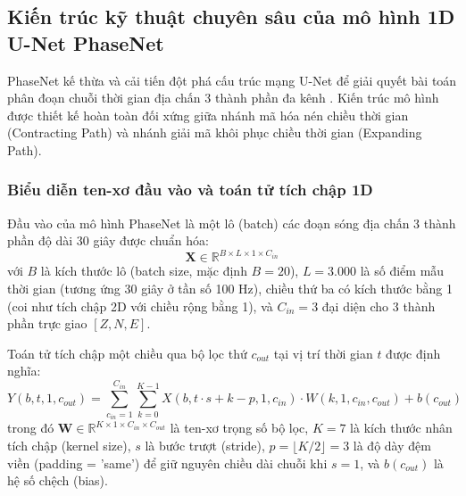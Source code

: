 \documentclass[preprint,1p]{elsarticle}
\begin{document}
\subsection{Kiến trúc kỹ thuật chuyên sâu của mô hình 1D U-Net PhaseNet}
\label{sec:methods_phasenet_deep}

PhaseNet kế thừa và cải tiến đột phá cấu trúc mạng U-Net \cite{ronneberger2015u} để giải quyết bài toán phân đoạn chuỗi thời gian địa chấn 3 thành phần đa kênh \cite{zhu2019phasenet}. Kiến trúc mô hình được thiết kế hoàn toàn đối xứng giữa nhánh mã hóa nén chiều thời gian (Contracting Path) và nhánh giải mã khôi phục chiều thời gian (Expanding Path).

\subsubsection{Biểu diễn ten-xơ đầu vào và toán tử tích chập 1D}
Đầu vào của mô hình PhaseNet là một lô (batch) các đoạn sóng địa chấn 3 thành phần độ dài 30 giây được chuẩn hóa:
\begin{equation}
\mathbf{X} \in \mathbb{R}^{B \times L \times 1 \times C_{in}}
\label{eq:input_tensor}
\end{equation}
với $B$ là kích thước lô (batch size, mặc định $B = 20$), $L = 3.000$ là số điểm mẫu thời gian (tương ứng 30 giây ở tần số 100 Hz), chiều thứ ba có kích thước bằng 1 (coi như tích chập 2D với chiều rộng bằng 1), và $C_{in} = 3$ đại diện cho 3 thành phần trực giao $[Z, N, E]$.

Toán tử tích chập một chiều qua bộ lọc thứ $c_{out}$ tại vị trí thời gian $t$ được định nghĩa:
\begin{equation}
Y(b, t, 1, c_{out}) = \sum_{c_{in}=1}^{C_{in}} \sum_{k=0}^{K-1} X(b, t \cdot s + k - p, 1, c_{in}) \cdot W(k, 1, c_{in}, c_{out}) + b(c_{out})
\label{eq:conv1d_math}
\end{equation}
trong đó $\mathbf{W} \in \mathbb{R}^{K \times 1 \times C_{in} \times C_{out}}$ là ten-xơ trọng số bộ lọc, $K = 7$ là kích thước nhân tích chập (kernel size), $s$ là bước trượt (stride), $p = \lfloor K/2 \rfloor = 3$ là độ dày đệm viền (padding = 'same') để giữ nguyên chiều dài chuỗi khi $s = 1$, và $b(c_{out})$ là hệ số chệch (bias).
\end{document}
